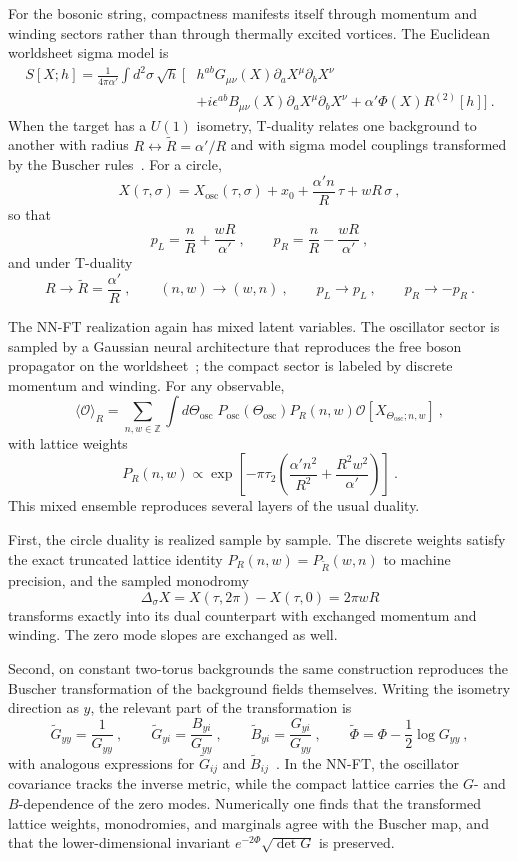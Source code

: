 \documentclass[11pt,a4paper]{article}
\newcommand\be{\begin{equation}}
\newcommand\ee{\end{equation}}
\begin{document}
For the bosonic string, compactness manifests itself through momentum and winding sectors rather than through thermally excited vortices. The Euclidean worldsheet sigma model is
\be
\begin{aligned}
S[X;h]=\frac{1}{4\pi\alpha'}\int d^2\sigma\,\sqrt h\,
\Big[&h^{ab}G_{\mu\nu}(X)\partial_aX^\mu\partial_bX^\nu\\
&+i\epsilon^{ab}B_{\mu\nu}(X)\partial_aX^\mu\partial_bX^\nu
+\alpha'\Phi(X)R^{(2)}[h]\Big]~.
\end{aligned}
\label{eq:sigma}
\ee
When the target has a $U(1)$ isometry, T-duality relates one background to another with radius $R\leftrightarrow \widetilde R=\alpha'/R$ and with sigma model couplings transformed by the Buscher rules~\cite{Buscher:1987sk,Buscher:1987qj}. For a circle,
\be
X(\tau,\sigma)=X_\text{osc}(\tau,\sigma)+x_0+\frac{\alpha' n}{R}\,\tau+wR\,\sigma~,
\label{eq:circlemode}
\ee
so that
\be
p_L=\frac{n}{R}+\frac{wR}{\alpha'}~,
\qquad
p_R=\frac{n}{R}-\frac{wR}{\alpha'}~,
\label{eq:plpr}
\ee
and under T-duality
\be
R\longrightarrow \widetilde R=\frac{\alpha'}{R}~,
\qquad (n,w)\longrightarrow (w,n)~,
\qquad p_L\longrightarrow p_L~,
\qquad p_R\longrightarrow -p_R~.
\label{eq:tduality}
\ee

The NN-FT realization again has mixed latent variables. The oscillator sector is sampled by a Gaussian neural architecture that reproduces the free boson propagator on the worldsheet~\cite{Frank:2026bui}; the compact sector is labeled by discrete momentum and winding. For any observable,
\be
\langle\mathcal O\rangle_R=
\sum_{n,w\in\mathbb Z}\int d\Theta_\text{osc}\;P_\text{osc}(\Theta_\text{osc})P_R(n,w)
\mathcal O[X_{\Theta_\text{osc};n,w}]~,
\label{eq:compactmix}
\ee
with lattice weights
\be
P_R(n,w)\propto
\exp\!\left[-\pi\tau_2\left(\frac{\alpha'n^2}{R^2}+\frac{R^2w^2}{\alpha'}\right)\right]~.
\label{eq:weights}
\ee
This mixed ensemble reproduces several layers of the usual duality.

First, the circle duality is realized sample by sample. The discrete weights satisfy the exact truncated lattice identity $P_R(n,w)=P_{\widetilde R}(w,n)$ to machine precision, and the sampled monodromy
\be
\Delta_\sigma X = X(\tau,2\pi)-X(\tau,0)=2\pi wR
\label{eq:monodromy}
\ee
transforms exactly into its dual counterpart with exchanged momentum and winding. The zero mode slopes are exchanged as well.

Second, on constant two-torus backgrounds the same construction reproduces the Buscher transformation of the background fields themselves. Writing the isometry direction as $y$, the relevant part of the transformation is
\be
\widetilde G_{yy}=\frac{1}{G_{yy}}~,
\qquad
\widetilde G_{yi}=\frac{B_{yi}}{G_{yy}}~,
\qquad
\widetilde B_{yi}=\frac{G_{yi}}{G_{yy}}~,
\qquad
\widetilde\Phi=\Phi-\frac12\log G_{yy}~,
\label{eq:buscher}
\ee
with analogous expressions for $\widetilde G_{ij}$ and $\widetilde B_{ij}$~\cite{Buscher:1987sk,Buscher:1987qj}. In the NN-FT, the oscillator covariance tracks the inverse metric, while the compact lattice carries the $G$- and $B$-dependence of the zero modes. Numerically one finds that the transformed lattice weights, monodromies, and marginals agree with the Buscher map, and that the lower-dimensional invariant $e^{-2\Phi}\sqrt{\det G}$ is preserved.
\end{document}

